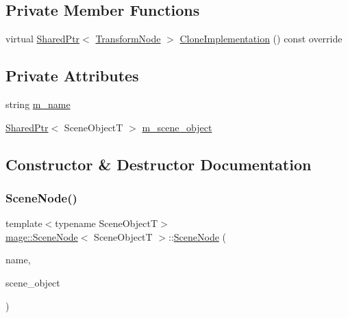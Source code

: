\subsection*{Private Member Functions}
\begin{DoxyCompactItemize}
\item 
virtual \hyperlink{namespacemage_a1e01ae66713838a7a67d30e44c67703e}{Shared\+Ptr}$<$ \hyperlink{classmage_1_1_transform_node}{Transform\+Node} $>$ \hyperlink{classmage_1_1_scene_node_a51ebb43d49e018665a181c863642a8bc}{Clone\+Implementation} () const override
\end{DoxyCompactItemize}
\subsection*{Private Attributes}
\begin{DoxyCompactItemize}
\item 
string \hyperlink{classmage_1_1_scene_node_a210a40aa88e7c21d4b506ff78581eb2f}{m\+\_\+name}
\item 
\hyperlink{namespacemage_a1e01ae66713838a7a67d30e44c67703e}{Shared\+Ptr}$<$ Scene\+ObjectT $>$ \hyperlink{classmage_1_1_scene_node_aa05fbcdeb18d75170a5d5af70de995a9}{m\+\_\+scene\+\_\+object}
\end{DoxyCompactItemize}


\subsection{Constructor \& Destructor Documentation}
\hypertarget{classmage_1_1_scene_node_afef93aec34dc43e60c18eaf1d89864be}{}\label{classmage_1_1_scene_node_afef93aec34dc43e60c18eaf1d89864be} 
\subsubsection{\texorpdfstring{Scene\+Node()}{SceneNode()}\hspace{0.1cm}{\footnotesize\ttfamily [1/3]}}
{\footnotesize\ttfamily template$<$typename Scene\+ObjectT$>$ \\
\hyperlink{classmage_1_1_scene_node}{mage\+::\+Scene\+Node}$<$ Scene\+ObjectT $>$\+::\hyperlink{classmage_1_1_scene_node}{Scene\+Node} (\begin{DoxyParamCaption}\item[{const string \&}]{name,  }\item[{\hyperlink{namespacemage_a1e01ae66713838a7a67d30e44c67703e}{Shared\+Ptr}$<$ Scene\+ObjectT $>$}]{scene\+\_\+object }\end{DoxyParamCaption})\hspace{0.3cm}{\ttfamily [explicit]}}

